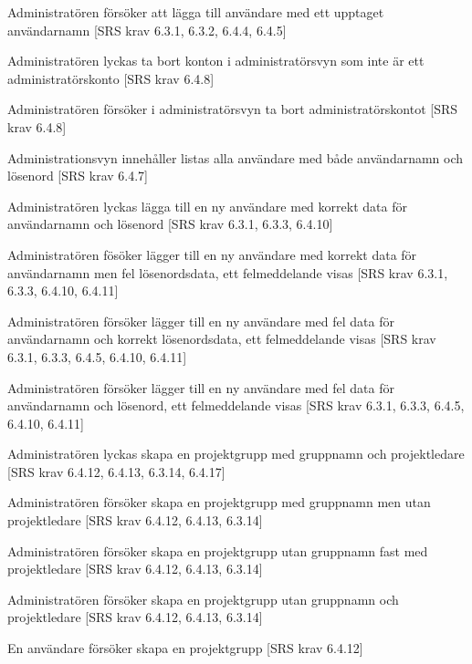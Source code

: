 \documentclass[a4paper]{article}
\begin{document}
\begin{appendices}
\begin{FT}
\item
Administratören försöker att lägga till användare med ett upptaget användarnamn [SRS krav 6.3.1, 6.3.2, 6.4.4, 6.4.5]

\item
Administratören lyckas ta bort konton i administratörsvyn som inte är ett administratörskonto [SRS krav 6.4.8]

\item
Administratören försöker i administratörsvyn ta bort administratörskontot [SRS krav 6.4.8]

\item
Administrationsvyn innehåller listas alla användare med både användarnamn och lösenord [SRS krav 6.4.7]

\item
Administratören lyckas lägga till en ny användare med korrekt data för användarnamn och lösenord [SRS krav 6.3.1, 6.3.3, 6.4.10]

\item
Administratören fösöker lägger till en ny användare med korrekt data för användarnamn men fel lösenordsdata, ett felmeddelande visas [SRS krav 6.3.1, 6.3.3, 6.4.10, 6.4.11]

\item
Administratören försöker lägger till en ny användare med fel data för användarnamn och korrekt lösenordsdata, ett felmeddelande visas [SRS krav 6.3.1, 6.3.3, 6.4.5, 6.4.10, 6.4.11]

\item
Administratören försöker lägger till en ny användare med fel data för användarnamn och lösenord, ett felmeddelande visas [SRS krav 6.3.1, 6.3.3, 6.4.5, 6.4.10, 6.4.11]

\item 
Administratören lyckas skapa en projektgrupp med gruppnamn och projektledare [SRS krav 6.4.12, 6.4.13, 6.3.14, 6.4.17]

\item 
Administratören försöker skapa en projektgrupp med gruppnamn men utan projektledare [SRS krav 6.4.12, 6.4.13, 6.3.14]

\item 
Administratören försöker skapa en projektgrupp utan gruppnamn fast med projektledare [SRS krav 6.4.12, 6.4.13, 6.3.14]

\item 
Administratören försöker skapa en projektgrupp utan gruppnamn och projektledare [SRS krav 6.4.12, 6.4.13, 6.3.14]

\item
En användare försöker skapa en projektgrupp [SRS krav 6.4.12]


\end{FT}
\end{appendices}
\end{document}
